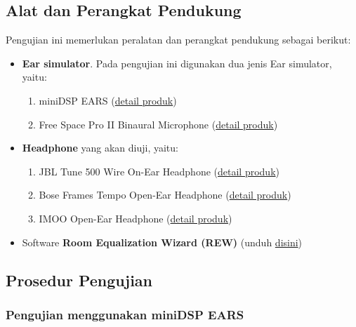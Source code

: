 \documentclass{article}
\begin{document}
	\subsection{Alat dan Perangkat Pendukung}
	Pengujian ini memerlukan peralatan dan perangkat pendukung sebagai berikut:
	\begin{itemize}
		\item \textbf{Ear simulator}. Pada pengujian ini digunakan dua jenis Ear simulator, yaitu:
		\begin{enumerate}
			\item miniDSP EARS (\href{https://www.minidsp.com/images/documents/Product%20Brief-EARS.pdf}{detail produk})
			\item Free Space Pro II Binaural Microphone (\href{https://3diosound.com/products/free-space-pro-binaural-microphone}{detail produk})
		\end{enumerate}
	
		\item \textbf{Headphone} yang akan diuji, yaitu:
		\begin{enumerate}
			\item JBL Tune 500 Wire On-Ear Headphone 
			(\href{https://id.jbl.com/over-ear-headphones/JBL+TUNE500.html}{detail produk})
			\item Bose Frames Tempo Open-Ear Headphone
			(\href{https://www.bose.com/en_us/products/frames/bose-frames-tempo.html#v=bose_frames_tempo_black_us}{detail produk})
			\item IMOO Open-Ear Headphone
			(\href{https://imoostore.com/pages/imoo-ear-care-headset}{detail produk})
		\end{enumerate}
		
		\item Software \textbf{Room Equalization Wizard (REW)} (unduh \href{https://www.roomeqwizard.com/}{disini})
	\end{itemize}
	
	\subsection{Prosedur Pengujian}
	\subsubsection{Pengujian menggunakan miniDSP EARS}
\end{document}
